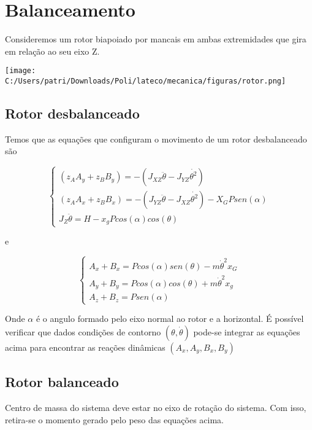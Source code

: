 \section{Balanceamento}

Consideremos um rotor biapoiado por mancais em ambas extremidades que gira em relação ao seu eixo Z.

\begin{center}
\texttt{[image: C:/Users/patri/Downloads/Poli/lateco/mecanica/figuras/rotor.png]}
\end{center}

\subsection{Rotor desbalanceado}

Temos que as equações que configuram o movimento de um rotor desbalanceado são

$$
\begin{cases}

(z_AA_y + z_BB_y) = -(J_{XZ}\ddot{\theta} - J_{YZ}\dot{\theta^2})\\
(z_AA_x + z_BB_x) = -(J_{YZ}\ddot{\theta} - J_{XZ}\dot{\theta^2}) - X_GPsen(\alpha) \\ 
J_Z\ddot{\theta} = H - x_gPcos(\alpha)cos(\theta)

\end{cases}$$

e

$$
\begin{cases}
A_x + B_x = Pcos(\alpha)sen(\theta) - m\dot{\theta}^2x_G \\
A_y + B_y = Pcos(\alpha)cos(\theta) + m\dot{\theta}^2x_g \\
A_z + B_z = Psen(\alpha)

\end{cases}
$$

Onde $\alpha$ é o angulo formado pelo eixo normal ao rotor e a horizontal.
É possível verificar que dados condições de contorno $(\theta, \dot{\theta})$ pode-se integrar as equações acima para encontrar as reações dinâmicas $(A_x, A_y, B_x, B_y)$

\subsection{Rotor balanceado}

\begin{namedtheorem}
Centro de massa do sistema deve estar no eixo de rotação do sistema. Com isso, retira-se o momento gerado pelo peso das equações acima.
\end{namedtheorem}

